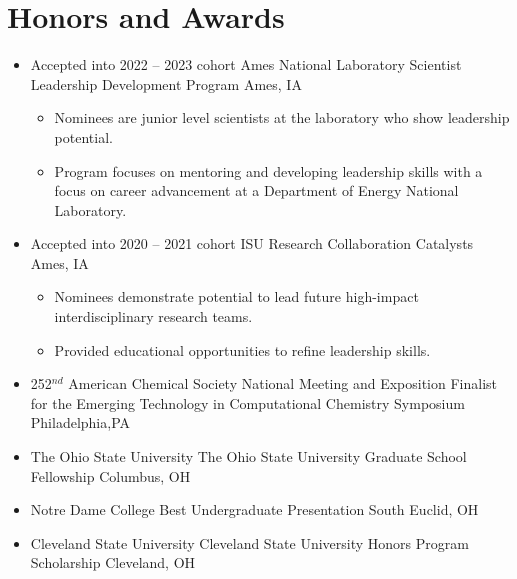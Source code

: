 \documentclass[11pt,a4paper,sans]{moderncv}
\begin{document}
\section{Honors and Awards}
\vspace{5pt}
\begin{itemize}
	\item{
          {Accepted into 2022 -- 2023 cohort}
          {Ames National Laboratory Scientist Leadership Development Program}
          {Ames, IA}
          {}
          {\begin{itemize}
                  \item{Nominees are junior level scientists at the laboratory
                        who show leadership potential.}
                  \item{Program focuses on mentoring and developing leadership
                        skills with a focus on career advancement at a
                        Department of Energy National Laboratory.}
           \end{itemize}}}
    \item{
  		 {Accepted into 2020 -- 2021 cohort}
 		 {ISU Research Collaboration Catalysts}
		 {Ames, IA}
		 {}
		 {\begin{itemize}
   		      \item{Nominees demonstrate potential to lead future high-impact
   		      interdisciplinary research teams.}
   		      \item{Provided educational opportunities to refine leadership
   		      skills.}
   	 	  \end{itemize}}}
	\item{
		  {252$^{nd}$ American Chemical Society National Meeting and
		  	 Exposition}
	  	 {Finalist for the Emerging Technology in Computational Chemistry
	  	 	Symposium}
	  	 {Philadelphia,PA}
	  	 {}
	  	 {}}
	\item{
		  {The Ohio State University}
		  {The Ohio State University Graduate School Fellowship}
		  {Columbus, OH}
		  {}
		  {}}
	\item{
		  {Notre Dame College}
		  {Best Undergraduate Presentation}
		  {South Euclid, OH}
		  {}
		  {}}
	\item{
          {Cleveland State University}
          {Cleveland State University Honors Program Scholarship}
          {Cleveland, OH}
          {}
          {}}
\end{itemize}
\end{document}
